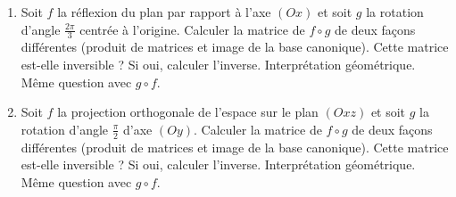 \documentclass[class=report,crop=false]{standalone}
\begin{document}
\begin{miniexercices}
\sauteligne
\begin{enumerate}
  \item Soit $f$ la réflexion du plan par rapport à l'axe $(Ox)$ et soit $g$
  la rotation d'angle $\frac{2\pi}{3}$ centrée à l'ori\-gine. Calculer la matrice de
  $f\circ g$ de deux façons différentes (produit de matrices et image de la base canonique).
  Cette matrice est-elle inversible ? Si oui, calculer l'inverse. Interprétation géométrique.
  Même question avec $g\circ f$.

  \item Soit $f$ la projection orthogonale de l'espace sur le plan $(Oxz)$ et soit $g$
  la rotation d'angle $\frac{\pi}{2}$ d'axe $(Oy)$. Calculer la matrice de
  $f\circ g$ de deux façons différentes (produit de matrices et image de la base canonique).
  Cette matrice est-elle inversible ? Si oui, calculer l'inverse. Interprétation géométrique.
  Même question avec $g\circ f$.
\end{enumerate}
\end{miniexercices}



\bigskip
\bigskip


\finchapitre
\end{document}
